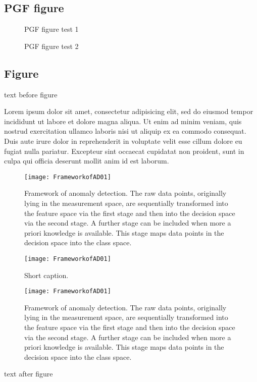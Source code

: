 \documentclass[10pt,a4paper,extrafontsizes,oldfontcommands,oneside]{memoir}
\begin{document}
\subsection{PGF figure} %
\label{sub:pgf_figure}

\begin{figure}[!htbp]

\caption{PGF figure test 1}
\label{fig:pgftest}
\end{figure}

\begin{figure}[!htbp]

\caption{PGF figure test 2}
\label{fig:pgftest2}
\end{figure}



\subsection{Figure} %
\label{sub:figure}

text before figure

Lorem ipsum dolor sit amet, consectetur adipisicing elit, sed do eiusmod tempor incididunt ut labore et dolore magna aliqua. Ut enim ad minim veniam, quis nostrud exercitation ullamco laboris nisi ut aliquip ex ea commodo consequat. Duis aute irure dolor in reprehenderit in voluptate velit esse cillum dolore eu fugiat nulla pariatur. Excepteur sint occaecat cupidatat non proident, sunt in culpa qui officia deserunt mollit anim id est laborum.

\begin{figure}[!htbp]
\centering{}\texttt{[image: FrameworkofAD01]} \caption{Framework of anomaly detection. The raw data points, originally lying
in the measurement space, are sequentially transformed into the feature
space via the first stage and then into the decision space via the
second stage. A further stage can be included when more a priori knowledge
is available. This stage maps data points in the decision space into
the class space.}
\label{fig:ADFramework}
\end{figure}

\begin{figure}[!htbp]
\centering{}\texttt{[image: FrameworkofAD01]} \caption{Short caption.}
\label{fig:ADFramework1}
\end{figure}

\begin{figure}[!htbp]
\texttt{[image: FrameworkofAD01]} 
\caption{Framework of anomaly detection. The raw data points, originally lying
in the measurement space, are sequentially transformed into the feature
space via the first stage and then into the decision space via the
second stage. A further stage can be included when more a priori knowledge
is available. This stage maps data points in the decision space into
the class space.}
\label{fig:ADFramework2}
\end{figure}
text after figure
\end{document}

